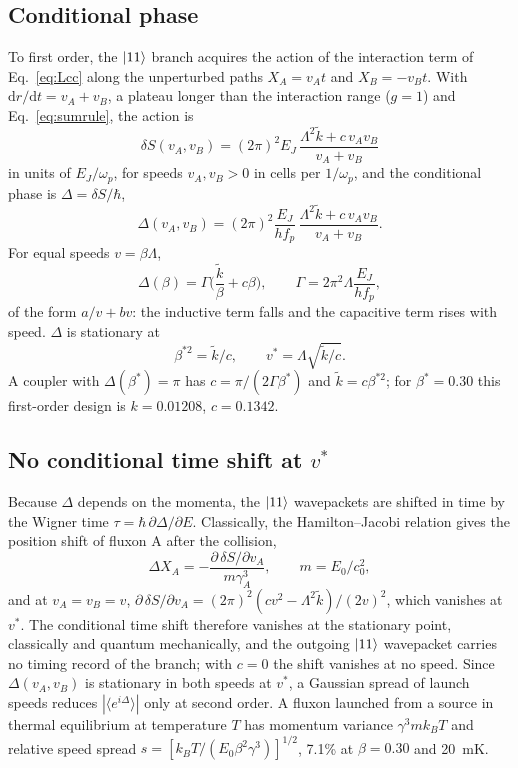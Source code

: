 \documentclass[10pt,twocolumn,letterpaper]{article}
\newcommand{\kt}{\tilde{k}}
\newcommand{\ud}{\mathrm{d}}
\begin{document}
\subsection{Conditional phase}
To first order, the $\ket{11}$ branch acquires the action of the interaction term of Eq.~\eqref{eq:Lcc} along the
unperturbed paths $X_A=v_At$ and $X_B=-v_Bt$. With $\ud r/\ud t=v_A+v_B$, a plateau longer than the interaction range
($g=1$) and Eq.~\eqref{eq:sumrule}, the action is
\begin{equation}
\delta S(v_A,v_B)=(2\pi)^2E_J\,\frac{\Lambda^2\kt+c\,v_Av_B}{v_A+v_B}
\label{eq:dS}
\end{equation}
in units of $E_J/\omega_p$, for speeds $v_A,v_B>0$ in cells per $1/\omega_p$, and the conditional phase is
$\Delta=\delta S/\hbar$,
\begin{equation}
\Delta(v_A,v_B)=(2\pi)^2\frac{E_J}{hf_p}\,\frac{\Lambda^2\kt+c\,v_Av_B}{v_A+v_B}.
\label{eq:Delta}
\end{equation}
For equal speeds $v=\beta\Lambda$,
\begin{equation}
\Delta(\beta)=\Gamma\Big(\frac{\kt}{\beta}+c\beta\Big),\qquad \Gamma=2\pi^2\Lambda\frac{E_J}{hf_p},
\label{eq:Deltabeta}
\end{equation}
of the form $a/v+bv$: the inductive term falls and the capacitive term rises with speed. $\Delta$ is stationary at
\begin{equation}
\beta^{*2}=\kt/c ,\qquad v^*=\Lambda\sqrt{\kt/c}.
\label{eq:betastar}
\end{equation}
A coupler with $\Delta(\beta^*)=\pi$ has $c=\pi/(2\Gamma\beta^*)$ and $\kt=c\beta^{*2}$; for $\beta^*=0.30$ this
first-order design is $k=0.01208$, $c=0.1342$.

\subsection{No conditional time shift at \texorpdfstring{$v^*$}{v*}}
Because $\Delta$ depends on the momenta, the $\ket{11}$ wavepackets are shifted in time by the Wigner time
$\tau=\hbar\,\partial\Delta/\partial E$. Classically, the Hamilton--Jacobi relation gives the position shift of
fluxon A after the collision,
\begin{equation}
\Delta X_A=-\frac{\partial\,\delta S/\partial v_A}{m\gamma_A^3},\qquad m=E_0/c_0^2 ,
\label{eq:shift}
\end{equation}
and at $v_A=v_B=v$, $\partial\,\delta S/\partial v_A=(2\pi)^2(cv^2-\Lambda^2\kt)/(2v)^2$, which vanishes at $v^*$. The
conditional time shift therefore vanishes at the stationary point, classically and quantum mechanically, and the
outgoing $\ket{11}$ wavepacket carries no timing record of the branch; with $c=0$ the shift vanishes at no speed.
Since $\Delta(v_A,v_B)$ is stationary in both speeds at $v^*$, a Gaussian spread of launch speeds reduces
$|\langle e^{i\Delta}\rangle|$ only at second order. A fluxon launched from a source in thermal equilibrium at
temperature $T$ has momentum variance $\gamma^3mk_BT$ and relative speed spread
$s=[k_BT/(E_0\beta^2\gamma^3)]^{1/2}$, 7.1\% at $\beta=0.30$ and 20~mK.
\end{document}
